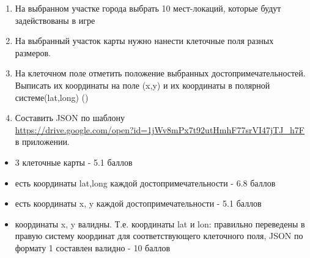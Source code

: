 
\begin{enumerate} 
    \item На выбранном участке города выбрать 10 мест-локаций, которые будут задействованы в игре
    \item На выбранный участок карты нужно нанести клеточные поля разных размеров.
    \item На клеточном поле отметить положение выбранных достопримечательностей. Выписать их координаты на поле (x,y) и их координаты в полярной системе(lat,long) ()
    \item Составить JSON по шаблону \\ \url{https://drive.google.com/open?id=1jWv8mPx7t92utHmhF77srVI47jTJ_h7F} в приложении.
\end{enumerate}

\markSection

\begin{itemize}
    \item 3 клеточные карты - 5.1 баллов
    \item есть координаты lat,long каждой достопримечательности - 6.8 баллов
    \item есть координаты x, y каждой достопримечательности - 5.1 баллов
    \item координаты x, y валидны. Т.е. координаты lat и lon: правильно переведены в правую систему координат для соответствующего клеточного поля, JSON по формату 1 составлен валидно - 10 баллов
\end{itemize}